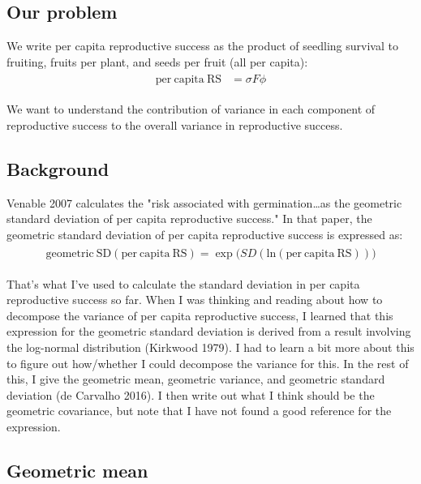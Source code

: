 \documentclass[12pt, oneside, titlepage]{article}   	%
\begin{document}
\subsection*{Our problem}

We write per capita reproductive success as the product of seedling survival to fruiting, fruits per plant, and seeds per fruit (all per capita):
%
\begin{align}
  \begin{split}
\mathrm{per\ capita\ RS} & =  \sigma F \phi
  \end{split}
\end{align}

We want to understand the contribution of variance in each component of reproductive success to the overall variance in reproductive success. 

\subsection*{Background}

Venable 2007 calculates the "risk associated with germination\dots as the geometric standard deviation of per capita reproductive success." In that paper, the geometric standard deviation of per capita reproductive success is expressed as:
%
\begin{align}
  \begin{split}
\mathrm{geometric\ SD(per\ capita\ RS)} = \exp \big( SD( \mathrm{ln} (\mathrm{per\ capita\ RS} ) ) \big)
  \end{split}
\end{align}

That's what I've used to calculate the standard deviation in per capita reproductive success so far. When I was thinking and reading about how to decompose the variance of per capita reproductive success, I learned that this expression for the geometric standard deviation is derived from a result involving the log-normal distribution (Kirkwood 1979). I had to learn a bit more about this to figure out how/whether I could decompose the variance for this. In the rest of this, I give the geometric mean, geometric variance, and geometric standard deviation (de Carvalho 2016).  I then write out what I think should be the geometric covariance, but note that I have not found a good reference for the expression.

\clearpage
\newpage

\subsection*{Geometric mean}
\end{document}
